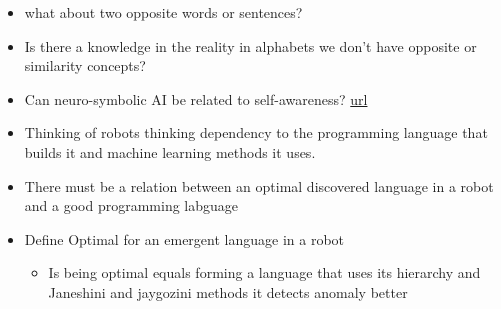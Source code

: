 \begin{itemize}
        \item what about two opposite words or sentences?
        \item Is there a knowledge in the reality in alphabets we don't have opposite or similarity concepts?
        \item Can neuro-symbolic AI be related to self-awareness? \href{https://en.wikipedia.org/wiki/Neuro-symbolic_AI}{url}
        \item Thinking of robots thinking dependency to the programming language that builds it and machine learning methods it uses.
        \item There must be a relation between an optimal discovered language in a robot and a good programming labguage
        \item Define Optimal for an emergent language in a robot
            \begin{itemize}
                \item Is being optimal equals forming a language that uses its hierarchy and Janeshini and jaygozini methods it detects anomaly better
            \end{itemize}
    \end{itemize}